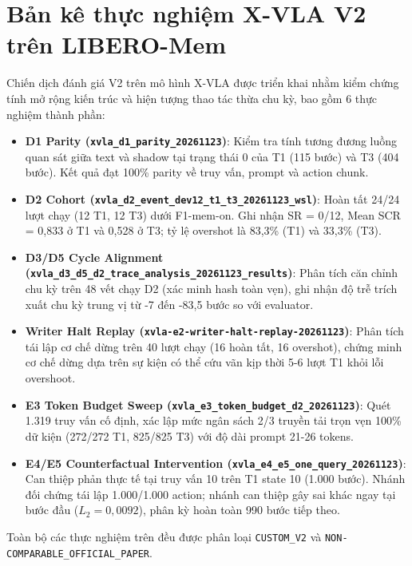 \section{Bản kê thực nghiệm X-VLA V2 trên LIBERO-Mem}
Chiến dịch đánh giá V2 trên mô hình X-VLA được triển khai nhằm kiểm chứng tính mở rộng kiến trúc và hiện tượng thao tác thừa chu kỳ, bao gồm 6 thực nghiệm thành phần:
\begin{itemize}
    \item \textbf{D1 Parity (\texttt{xvla\_d1\_parity\_20261123})}: Kiểm tra tính tương đương luồng quan sát giữa text và shadow tại trạng thái 0 của T1 (115 bước) và T3 (404 bước). Kết quả đạt 100\% parity về truy vấn, prompt và action chunk.
    \item \textbf{D2 Cohort (\texttt{xvla\_d2\_event\_dev12\_t1\_t3\_20261123\_wsl})}: Hoàn tất 24/24 lượt chạy (12 T1, 12 T3) dưới F1-mem-on. Ghi nhận SR = 0/12, Mean SCR = 0,833 ở T1 và 0,528 ở T3; tỷ lệ overshot là 83,3\% (T1) và 33,3\% (T3).
    \item \textbf{D3/D5 Cycle Alignment (\texttt{xvla\_d3\_d5\_d2\_trace\_analysis\_20261123\_results})}: Phân tích căn chỉnh chu kỳ trên 48 vết chạy D2 (xác minh hash toàn vẹn), ghi nhận độ trễ trích xuất chu kỳ trung vị từ -7 đến -83,5 bước so với evaluator.
    \item \textbf{Writer Halt Replay (\texttt{xvla-e2-writer-halt-replay-20261123})}: Phân tích tái lập cơ chế dừng trên 40 lượt chạy (16 hoàn tất, 16 overshot), chứng minh cơ chế dừng dựa trên sự kiện có thể cứu vãn kịp thời 5-6 lượt T1 khỏi lỗi overshoot.
    \item \textbf{E3 Token Budget Sweep (\texttt{xvla\_e3\_token\_budget\_d2\_20261123})}: Quét 1.319 truy vấn cố định, xác lập mức ngân sách 2/3 truyền tải trọn vẹn 100\% dữ kiện (272/272 T1, 825/825 T3) với độ dài prompt 21-26 tokens.
    \item \textbf{E4/E5 Counterfactual Intervention (\texttt{xvla\_e4\_e5\_one\_query\_20261123})}: Can thiệp phản thực tế tại truy vấn 10 trên T1 state 10 (1.000 bước). Nhánh đối chứng tái lập 1.000/1.000 action; nhánh can thiệp gây sai khác ngay tại bước đầu ($L_2 = 0{,}0092$), phân kỳ hoàn toàn 990 bước tiếp theo.
\end{itemize}
Toàn bộ các thực nghiệm trên đều được phân loại \texttt{CUSTOM\_V2} và \texttt{NON-COMPARABLE\_OFFICIAL\_PAPER}.
